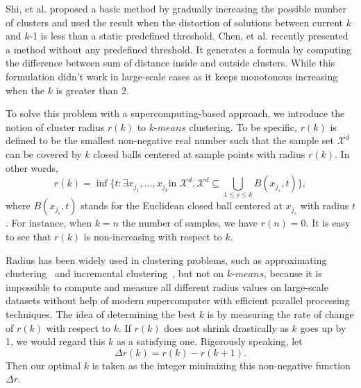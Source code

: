 \documentclass[10pt,journal,compsoc]{IEEEtran}
\begin{document}
Shi, et al. \cite{shi2004adaptive} proposed a basic method by gradually increasing the possible number of clusters and used the result when the distortion of solutions between current $k$ and $k$-1 is less than a static predefined threshold.
Chen, et al. \cite{chen2018improved} recently presented a method without any predefined threshold. It generates a formula by computing the difference between sum of distance inside and outside clusters.
While this formulation didn't work in large-scale cases as it keeps monotonous increasing when the $k$ is greater than 2.

To solve this problem with a supercomputing-based approach, we introduce the notion of cluster radius $r(k)$ to $k$-$means$ clustering. To be specific, $r(k)$ is defined to be the smallest non-negative real number such that the sample set $\mathcal{X}^d$ can be covered by $k$ closed balls centered at sample points with radius $r(k)$. In other words,
\[
r(k) = \inf\{t: \exists x_{j_1}, \ldots, x_{j_k} \text{in } \mathcal{X}^d, \mathcal{X}^d\subseteq \bigcup_{1\leq s\leq k} B(x_{j_s}, t)\},
\]
where $B(x_{j_s}, t)$ stands for the Euclidean closed ball centered at $x_{j_s}$ with radius $t$. For instance, when $k = n$ the number of samples, we have $r(n) = 0$. It is easy to see that $r(k)$ is non-increasing with respect to $k$.

Radius has been widely used in clustering problems, such as approximating clustering~\cite{badoiu2002approximate} and incremental clustering~\cite{charikar2004incremental}, but not on $k$-$means$, because it is impossible to compute and measure all different radius values on large-scale datasets without help of modern supercomputer with efficient parallel processing techniques. The idea of determining the best $k$ is by measuring the rate of change of $r(k)$ with respect to $k$. If $r(k)$ does not shrink drastically as $k$ goes up by 1, we would regard this $k$ as a satisfying one. Rigorously speaking, let
\[
\Delta r(k) = r(k) - r(k+1).
\]
Then our optimal $k$ is taken as the integer minimizing this non-negative function $\Delta r$.
\end{document}
